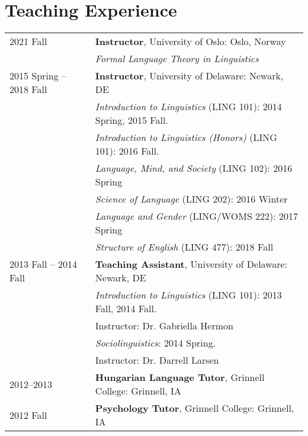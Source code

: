 \documentclass[11pt]{article} %
\begin{document}
\section*{Teaching Experience}
\begin{longtable}{p{1.6in} p{5.3in}}
	2021 Fall & \textbf{Instructor}, University of Oslo: Oslo, Norway \\
	& \textit{Formal Language Theory in Linguistics} \\
	2015 Spring -- 2018 Fall & \textbf{Instructor}, University of Delaware: Newark, DE \\  
	& \textit{Introduction to Linguistics} (LING 101): 2014 Spring, 2015 Fall. 
	\\ 
	& \textit{Introduction to Linguistics (Honors)} (LING 101): 2016 Fall.\\
	& \textit{Language, Mind, and Society} (LING 102): 2016 Spring \\
	& \textit{Science of Language} (LING 202): 2016 Winter \\ 
	& \textit{Language and Gender} (LING/WOMS 222): 2017 Spring \\
	& \textit{Structure of English} (LING 477): 2018 Fall \\
	[5pt]
	2013 Fall -- 2014 Fall & \textbf{Teaching Assistant}, University of Delaware: Newark, DE \\ 
	& \textit{Introduction to Linguistics} (LING 101): 2013 Fall, 2014 Fall. \\
	& \hspace{0.2in} Instructor: Dr. Gabriella Hermon \\
	& \textit{Sociolinguistics}: 2014 Spring.\\
	& \hspace{0.2in} Instructor: Dr. Darrell Larsen \\
	[5pt]
	2012--2013 & \textbf{Hungarian Language Tutor}, Grinnell College: Grinnell, IA \\[5pt]
	2012 Fall & \textbf{Psychology Tutor}, Grinnell College: Grinnell, IA \\
	
\end{longtable}


\end{document}
